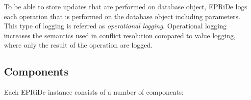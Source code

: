 To be able to store updates that are performed on database object, EPRiDe logs each operation that is performed on the database object including parameters. This type of logging is referred as \emph{operational logging}. Operational logging increases the semantics used in conflict resolution compared to value logging, where only the result of the operation are logged. 




	
	
	

	



\subsection{Components} %
\label{sub:components}

Each EPRiDe instance consists of a number of components:

